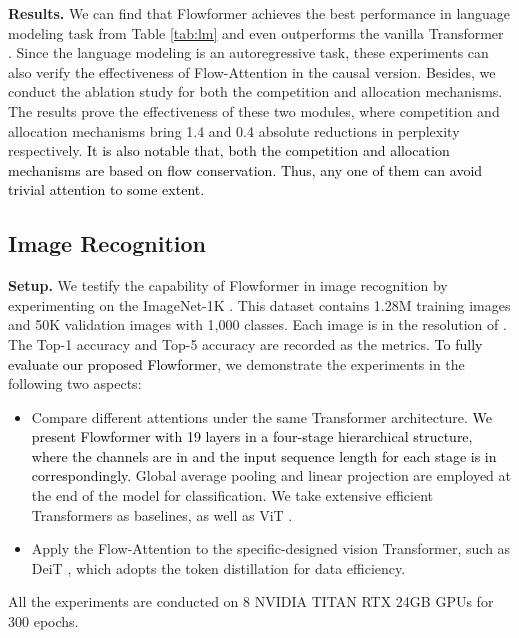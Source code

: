 \documentclass[nohyperref]{article}
\theoremstyle{plain}
\theoremstyle{definition}
\theoremstyle{remark}
\newcommand{\update}[1]{{\textcolor{black}{#1}}}
\begin{document}
\textbf{Results.} We can find that Flowformer achieves the best performance in language modeling task from Table \ref{tab:lm} and even outperforms the vanilla Transformer \cite{NIPS2017_3f5ee243}. Since the language modeling is an autoregressive task, these experiments can also verify the effectiveness of Flow-Attention in the causal version. Besides, we conduct the ablation study for both the competition and allocation mechanisms. The results prove the effectiveness of these two modules, where competition and allocation mechanisms bring 1.4 and 0.4 absolute reductions in perplexity respectively. \update{It is also notable that, both the competition and allocation mechanisms are based on flow conservation. Thus, any one of them can avoid trivial attention to some extent.}


\subsection{Image Recognition}

\textbf{Setup.} We testify the capability of Flowformer in image recognition by experimenting on the ImageNet-1K \cite{Deng2009ImageNetAL}. This dataset contains 1.28M training images and 50K validation images with 1,000 classes. Each image is in the resolution of . The Top-1 accuracy and Top-5 accuracy are recorded as the metrics. \update{To fully evaluate our proposed Flowformer}, we demonstrate the experiments in the following two aspects:
\begin{itemize}
    \item Compare different attentions under the same Transformer architecture. \update{We present Flowformer with 19 layers in a four-stage hierarchical structure, where the channels are in  and the input sequence length for each stage is in  correspondingly.} Global average pooling and linear projection are employed at the end of the model for classification. We take extensive efficient Transformers as baselines, as well as ViT \citeyearpar{dosovitskiy2021an}.
    \item Apply the Flow-Attention to the specific-designed vision Transformer, such as DeiT \cite{Touvron2021TrainingDI}, which adopts the token distillation for data efficiency.
\end{itemize}
All the experiments are conducted on 8 NVIDIA TITAN RTX 24GB GPUs for 300 epochs.
\end{document}
